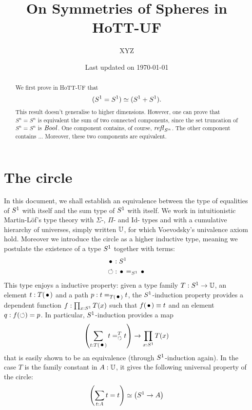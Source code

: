\documentclass[english,a4]{article}
\title{{On Symmetries of Spheres in HoTT-UF}}%
\author{\normalsize XYZ} %
\date{\normalsize Last updated on \today}%
\def\U{\universe U}%
\begin{document}
\maketitle

\begin{abstract}
  We first prove in HoTT-UF that
  \begin{displaymath}
    ({S^1} = {S^1}) \simeq ({S^1} + {S^1}).
  \end{displaymath}
This result doesn't generalise to higher dimensions.
However, one can prove that $S^n = S^n$ is equivalent the sum of two
connected components, since the set truncation of $S^n = S^n$ is $\mathop{\mathit{Bool}}$. 
One component contains, of course, $\mathop{{\mathit{refl}}_{S^n}}$.
The other component contains ...
Moreover, these two components are equivalent.
\end{abstract}


\section{The circle}
In this document, we shall establish an equivalence
between the type of equalities of ${S^1}$ with itself and the sum type
of ${S^1}$ with itself. We work in intuitionistic Martin-Löf's type
theory with $\Sigma$-, $\Pi$- and $\mathrm{Id}$- types and with a
cumulative hierarchy of universes, simply written $\U$, for
which Voevodsky's univalence axiom hold. Moreover we introduce the
circle as a higher inductive type, meaning we postulate the existence
of a type ${S^1}$ together with terms:
\begin{align}
  \label{eq:1}
  \base &: \Sc\\
  \Sloop &: \base =_{\Sc} \base
\end{align}
This type enjoys a inductive property: given a type family
$T : \Sc \to \U$, an element $t:T(\base)$ and a path
$p:t=_{T(\base)}t$, the ${S^1}$-induction property provides a dependent
function $f : \prod_{x:{S^1}}T(x)$ such that $f(\base) \jdeq t$ and an
element $q: f(\mathord{\circlearrowleft}) = p$. In particular, ${S^1}$-induction provides a
map
\begin{equation}
  \label{eq:2}
  \left(\sum_{t:T(\base)} \pathover t T \Sloop t\right) \to \prod_{x:\Sc}T(x)
\end{equation}
that is easily shown to be an equivalence (through ${S^1}$-induction
again). In the case $T$ is the family constant in $A:\U$, it gives the
following universal property of the circle:
\begin{equation}
  \label{eq:3}
  \left(\sum_{t:A}t=t\right) \simeq \left( {S^1} \to A \right)
\end{equation}
\end{document}
